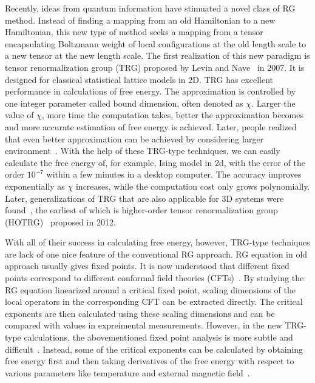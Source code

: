 \documentclass[aps,prb,reprint,superscriptaddress]{revtex4-2}
\begin{document}
Recently, ideas from quantum information have stimuated a novel class of
RG method. Instead of finding a mapping from an old Hamiltonian to a new
Hamiltonian, this new type of method seeks a mapping from a tensor
encapsulating Boltzmann weight of local configurations at the old length
scale to a new tensor at the new length scale. The first realization of
this new paradigm is tensor renormalization group (TRG) proposed by
Levin and Nave~\cite{trg} in 2007. It is designed for classical
statistical lattice models in 2D.
TRG has excellent performance in calculations of free energy. The
approximation is controlled by one integer parameter called bound
dimension, often denoted as $\chi$. Larger the value of $\chi$, more
time the computation takes, better the approximation becomes and more
accurate estimation of free energy is achieved. Later, people realized
that even better approximation can be achieved by considering larger
environment~\cite{SRGa,SRGb,hotrg,morita2020global}. With the help of
these TRG-type techniques, we can easily calculate the free energy of,
for example, Ising model in 2d, with the error of the order $10^{-7}$
within a few minutes in a desktop computer. The accuracy improves
exponentially as $\chi$ increases, while the computation cost only grows
polynomially. Later, generalizations of TRG that are also applicable for
3D systems were found~\cite{hotrg,atrg,triadtrg}, the earliest of which
is higher-order tensor renormalization group (HOTRG)~\cite{hotrg}
proposed in 2012.
%

With all of their success in calculating free energy, however, TRG-type
techniques are lack of one nice feature of the conventional RG approach.
RG equation in old approach usually gives fixed points. It is now
understood that different fixed points correspond to different conformal
field theories (CFTs)~\cite{polchinski1988,nakayama2015}. By studying
the RG equation linearized around a critical fixed point, scaling
dimensions of the local operators in the corresponding CFT can be
extracted directly. The critical exponents are then calculated using
these scaling dimensions and can be compared with values in expreimental
measurements. However, in the new TRG-type calculations, the
abovementioned fixed point analysis is more subtle and
difficult~\cite{kadanoff2014}.  Instead, some of the critical exponents
can be calculated by obtaining free energy first and then taking
derivatives of the free energy with respect to various parameters like
temperature and external magnetic field~\cite{hotrg,
Berker2008,xiang2019adtrg}. 
%
\end{document}
